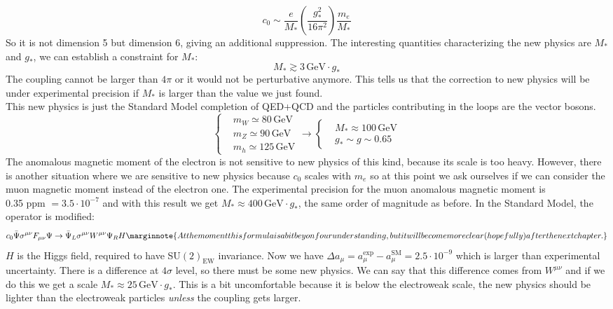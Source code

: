 \documentclass[../main.tex]{subfiles}
\begin{document}
\begin{example}
\[
c_0\sim\frac{e}{M_*}\left(\frac{g_*^2}{16\pi^2}\right)\frac{m_e}{M_*}
\]
So it is not dimension 5 but dimension 6, giving an additional suppression. The interesting quantities characterizing the new physics are $M_*$ and $g_*$, we can establish a constraint for $M_*$:
\[
M_*\gtrsim3\,\text{GeV}\cdot g_*
\]
The coupling cannot be larger than $4\pi$ or it would not be perturbative anymore. This tells us that the correction to new physics will be under experimental precision if $M_*$ is larger than the value we just found.\\
This new physics is just the Standard Model completion of QED+QCD and the particles contributing in the loops are the vector bosons.
\[
\left\{
\begin{aligned}
&m_W\simeq80\,\text{GeV}\\
&m_Z\simeq90\,\text{GeV}\\
&m_h\simeq125\,\text{GeV}
\end{aligned}
\right.
\to
\left\{
\begin{aligned}
&M_*\approx100\,\text{GeV}\\
&g_*\sim g\sim0.65
\end{aligned}
\right.
\]
The anomalous magnetic moment of the electron is not sensitive to new physics of this kind, because its scale is too heavy. However, there is another situation where we are sensitive to new physics because $c_0$ scales with $m_e$ so at this point we ask ourselves if we can consider the muon magnetic moment instead of the electron one. The experimental precision for the muon anomalous magnetic moment is\\
0.35 ppm $=3.5\cdot10^{-7}$ and with this result we get $M_*\approx400\,\text{GeV}\cdot g_*$, the same order of magnitude as before. In the Standard Model, the operator is modified:
\[
c_0\Bar{\Psi}\sigma^{\mu\nu}F_{\mu\nu}\Psi\to\Bar{\Psi}_L\sigma^{\mu\nu}W^{\mu\nu}\Psi_RH\marginnote{At the moment this formula is a bit beyonf our understanding, but it will become more clear (hopefully) after the next chapter.}
\]
$H$ is the Higgs field, required to have SU$(2)_{\text{EW}}$ invariance. Now we have $\Delta a_\mu=a_\mu^{\text{exp}}-a_\mu^{\text{SM}}=2.5\cdot10^{-9}$ which is larger than experimental uncertainty. There is a difference at $4\sigma$ level, so there must be some new physics. We can say that this difference comes from $W^{\mu\nu}$ and if we do this we get a scale
$M_*\approx25\,\text{GeV}\cdot g_*$. This is a bit uncomfortable because it is below the electroweak scale, the new physics should be lighter than the electroweak particles \textit{unless} the coupling gets larger.
\end{example}
\end{document}
